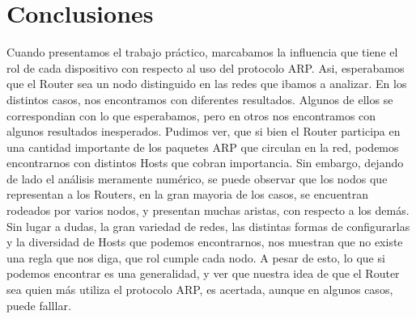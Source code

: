 \documentclass[a4paper, 11pt]{article}
\begin{document}
\section{Conclusiones}
Cuando presentamos el trabajo pr\'actico, marcabamos la influencia que tiene el rol de cada dispositivo con respecto al uso del protocolo ARP. Asi, esperabamos que el Router sea un nodo distinguido en las redes que ibamos a analizar.
En los distintos casos, nos encontramos con diferentes resultados. Algunos de ellos se correspondian con lo que esperabamos, pero en otros nos encontramos con algunos resultados inesperados.
Pudimos ver, que si bien el Router participa en una cantidad importante de los paquetes ARP que circulan en la red, podemos encontrarnos con distintos Hosts que cobran importancia.
Sin embargo, dejando de lado el an\'alisis meramente num\'erico, se puede observar que los nodos que representan a los Routers, en la gran mayoria de los casos, se encuentran rodeados por varios nodos, y presentan muchas aristas, con respecto a los dem\'as.
Sin lugar a dudas, la gran variedad de redes, las distintas formas de configurarlas y la diversidad de Hosts que podemos encontrarnos, nos muestran que no existe una regla que nos diga, que rol cumple cada nodo. A pesar de esto, lo que si podemos encontrar es una generalidad, y ver que nuestra idea de que el Router sea quien m\'as utiliza el protocolo ARP, es acertada, aunque en algunos casos, puede falllar.
\end{document}
